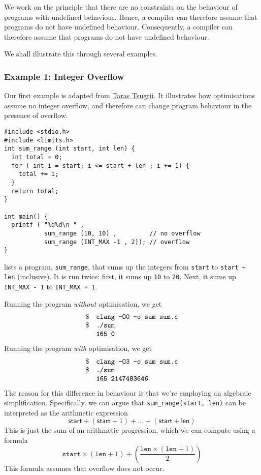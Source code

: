 We work on the principle that there are no constraints on the behaviour of programs with undefined behaviour. Hence, a compiler can therefore assume that programs do not have undefined behaviour. Consequently, a compiler can therefore assume that programs do not have undefined behaviour.

We shall illustrate this through several examples.

\subsubsection{Example 1: Integer Overflow}
Our first example is adapted from \href{https://softwarebits.substack.com/p/impact-of-undefined-behavior-on-performance}{Taras Tsugrii}. It illustrates how optimisations assume no integer overflow, and therefore can change program behaviour in the presence of overflow. 

\begin{code}
\label{code:optimisation-ub-overflow}
\begin{verbatim}
#include <stdio.h>
#include <limits.h>
int sum_range (int start, int len) {
  int total = 0;
  for ( int i = start; i <= start + len ; i += 1) {
    total += i;
  }
  return total;
}

int main() {
  printf ( "%d%d\n " , 
           sum_range (10, 10) ,         // no overflow
           sum_range (INT_MAX -1 , 2)); // overflow
}
\end{verbatim}
\end{code}

 lists a program, \texttt{sum\_range}, that sums up the integers from \texttt{start} to \texttt{start + len} (inclusive). It is run twice: first, it sums up \texttt{10} to \texttt{20}. Next, it sums up \texttt{INT\_MAX - 1} to \texttt{INT\_MAX + 1}.

Running the program \textit{without} optimisation, we get
\[\begin{array}{ll}
    \$ & \texttt{clang -O0 -o sum sum.c} \\
    \$ & \texttt{./sum} \\
       & \texttt{\textbf{165 0}}
\end{array}\]
Running the program \textit{with} optimisation, we get
\[\begin{array}{ll}
    \$ & \texttt{clang -O3 -o sum sum.c} \\
    \$ & \texttt{./sum} \\
       & \texttt{\textbf{165 2147483646}}
\end{array}\]
The reason for this difference in behaviour is that we're employing an algebraic simplification. Specifically, we can argue that \texttt{sum\_range(start, len)} can be interpreted as the arithmetic expression
\[\textsf{start} + (\textsf{start}+1) + \ldots + (\textsf{start}+\textsf{len})\]
This is just the sum of an arithmetic progression, which we can compute using a formula 
\[\texttt{start} \times (\texttt{len} + 1) + (\frac{\texttt{len}\times(\texttt{len}+1)}{2})\]
This formula assumes that overflow does not occur.

